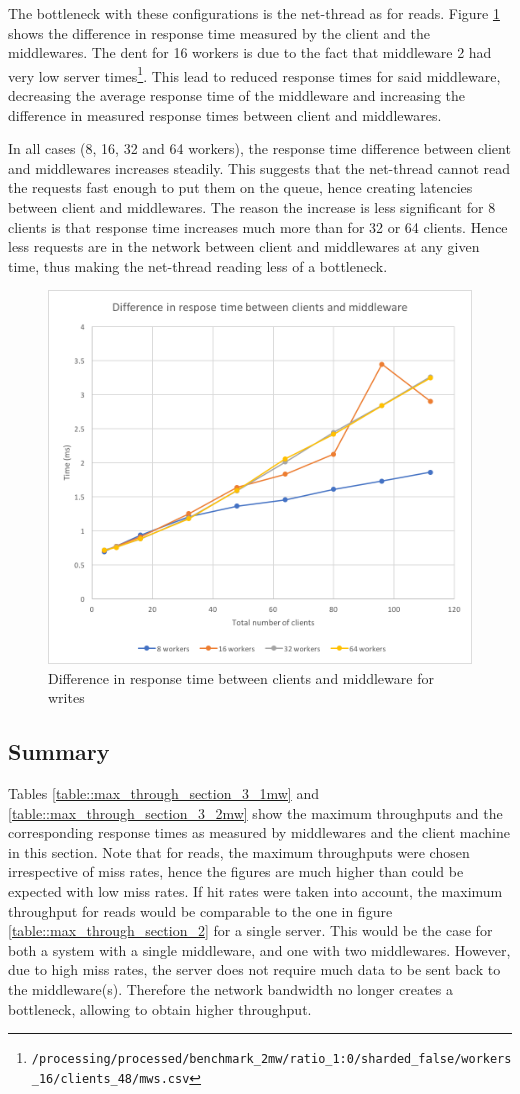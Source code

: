 \documentclass[11pt,a4paper]{article}
\begin{document}
The bottleneck with these configurations is the net-thread as for reads. Figure \ref{png::bench_2mw_netlat_writes} shows the difference in response time measured by the client and the middlewares. The dent for 16 workers is due to the fact that middleware 2 had very low server times\footnote{\texttt{/processing/processed/benchmark_2mw/ratio_1:0/sharded_false/workers_16/clients_48/mws.csv}}. This lead to reduced response times for said middleware, decreasing the average response time of the middleware and increasing the difference in measured response times between client and middlewares.

In all cases (8, 16, 32 and 64 workers), the response time difference between client and middlewares increases steadily. This suggests that the net-thread cannot read the requests fast enough to put them on the queue, hence creating latencies between client and middlewares. The reason the increase is less significant for 8 clients is that response time increases much more than for 32 or 64 clients. Hence less requests are in the network between client and middlewares at any given time, thus making the net-thread reading less of a bottleneck.

\begin{figure}[!h]
    \centering
    \includegraphics[width=.45\textwidth]{processing/graphics/bench_2mw_netlat_writes.png}
    \caption{Difference in response time between clients and middleware for writes}
    \label{png::bench_2mw_netlat_writes}
\end{figure}

\subsection{Summary}
Tables \ref{table::max_through_section_3_1mw} and \ref{table::max_through_section_3_2mw} show the maximum throughputs and the corresponding response times as measured by middlewares and the client machine in this section. Note that for reads, the maximum throughputs were chosen irrespective of miss rates, hence the figures are much higher than could be expected with low miss rates. If hit rates were taken into account, the maximum throughput for reads would be comparable to the one in figure \ref{table::max_through_section_2} for a single server. This would be the case for both a system with a single middleware, and one with two middlewares. However, due to high miss rates, the server does not require much data to be sent back to the middleware(s). Therefore the network bandwidth no longer creates a bottleneck, allowing to obtain higher throughput.
\end{document}
